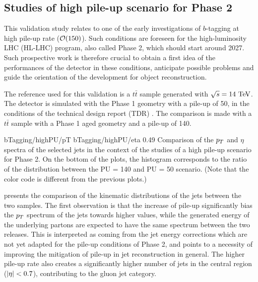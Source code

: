     \subsection{Studies of high pile-up scenario for Phase 2}

    This validation study relates to one of the early investigations of $b$-tagging at high
    pile-up rate ($\mathcal{O}(150)$). Such conditions are
    foreseen for the high-luminosity LHC (HL-LHC) program, also called Phase 2, which
    should start around 2027. Such prospective work is therefore crucial to obtain a first
    idea of the performances of the detector in these conditions, anticipate possible
    problems and guide the orientation of the development for object reconstruction.

    The reference used for this validation is a $t\bar{t}$ sample generated with $\sqrt{s}
    = 14~\text{TeV}$. The detector is simulated with the Phase 1 geometry with
    a pile-up of 50, in the conditions of the technical design report (TDR) \cite{Phase1TDR}. The
    comparison is made with a $t\bar{t}$ sample with a Phase 1 aged geometry and a pile-up
    of 140.

                     {bTagging/highPU/pT}
                     {bTagging/highPU/eta}
                     {0.49}
                     {Comparison of the $p_T$ and $\eta$ spectra of the selected jets
                     in the context of the studies of a high pile-up scenario for Phase 2.
                     On the bottom of the plots, the histogram corresponds
                     to the ratio of the distribution between the PU = 140 and PU = 50
                     scenario.
                     (Note that the color code is different from the previous plots.)}

     presents the comparison of the kinematic
    distributions of the jets between the two samples. The first observation is that the increase of pile-up
    significantly bias the $p_T$ spectrum of the jets towards higher values, while the
    generated energy of the underlying partons are expected to have the same spectrum
    between the two releases. This is interpreted as coming from the jet energy corrections
    which are not yet adapted for the pile-up conditions of Phase 2, and points to
    a necessity of improving the mitigation of pile-up in jet reconstruction in general.
    The higher pile-up rate also creates a significantly higher
    number of jets in the central region ($\left| \eta \right| < 0.7$), contributing to the gluon jet
    category.

